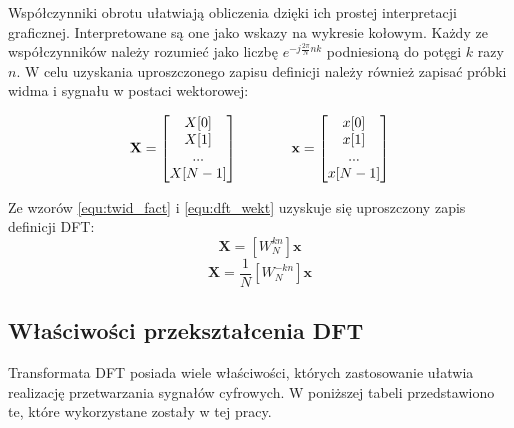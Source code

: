 Współczynniki obrotu ułatwiają obliczenia dzięki ich prostej interpretacji graficznej. Interpretowane są one jako wskazy na wykresie kołowym. Każdy ze współczynników należy rozumieć jako liczbę $e^{-j\frac{2\pi}{N}nk}$ podniesioną do potęgi $k$ razy $n$. W celu uzyskania uproszczonego zapisu definicji należy również zapisać próbki widma i sygnału w postaci wektorowej:

\begin{equation} \label{equ:dft_wekt}
\openup\jot
\begin{aligned}[t]
\mathbf{X} = 
\begin{bmatrix} 
X[0] \\ X[1] \\ ... \\ X[N-1]
\end{bmatrix}
\end{aligned}
\qquad\qquad %
\begin{aligned}[t]
\mathbf{x} =  
\begin{bmatrix} 
x[0] \\ x[1] \\ ... \\ x[N-1]
\end{bmatrix}
\end{aligned}
\end{equation}

Ze wzorów \ref{equ:twid_fact} i \ref{equ:dft_wekt} uzyskuje się uproszczony zapis definicji DFT:
\begin{equation} \label{equ:dft_upr}
	\mathbf{X} = [W_{N}^{kn}]\mathbf{x}
\end{equation}
\begin{equation} \label{equ:idft_upr}
\mathbf{X} = \frac{1}{N}[W_{N}^{-kn}]\mathbf{x}
\end{equation}

\subsection{Właściwości przekształcenia DFT}
Transformata DFT posiada wiele właściwości, których zastosowanie ułatwia realizację przetwarzania sygnałów cyfrowych. W poniższej tabeli przedstawiono te, które wykorzystane zostały w tej pracy.

